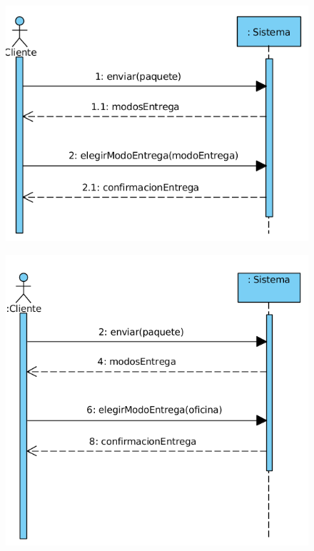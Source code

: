 \begin{figure}[H]
	\centering
	\includegraphics[width=16cm]{47}
\end{figure}
\begin{figure}[H]
	\centering
	\includegraphics[width=16cm]{48}
\end{figure}
